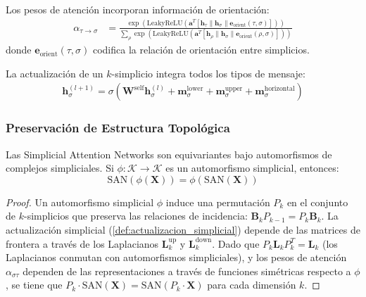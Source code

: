 \begin{definition}\label{def:pesos_atencion_simplicial}
Los pesos de atención incorporan información de orientación:
\begin{align}
    \alpha_{\tau \to \sigma} &= \frac{\exp(\text{LeakyReLU}(\mathbf{a}^T [\mathbf{h}_{\tau} \| \mathbf{h}_{\sigma} \| \mathbf{e}_{\text{orient}}(\tau,\sigma)]))}{\sum_{\rho} \exp(\text{LeakyReLU}(\mathbf{a}^T [\mathbf{h}_{\rho} \| \mathbf{h}_{\sigma} \| \mathbf{e}_{\text{orient}}(\rho,\sigma)]))}
\end{align}
donde $\mathbf{e}_{\text{orient}}(\tau,\sigma)$ codifica la relación de orientación entre simplicios.
\end{definition}

\begin{definition}\label{def:actualizacion_simplicial}
La actualización de un $k$-simplicio integra todos los tipos de mensaje:
\begin{align}
    \mathbf{h}_{\sigma}^{(l+1)} = \sigma\left(\mathbf{W}^{\text{self}} \mathbf{h}_{\sigma}^{(l)} + \mathbf{m}_{\sigma}^{\text{lower}} + \mathbf{m}_{\sigma}^{\text{upper}} + \mathbf{m}_{\sigma}^{\text{horizontal}}\right)
\end{align}
\end{definition}

\subsubsection{Preservación de Estructura Topológica}

\begin{theorem}\label{thm:equivarianza_simplicial}
Las Simplicial Attention Networks son equivariantes bajo automorfismos de complejos simpliciales. Si $\phi: \mathcal{K} \to \mathcal{K}$ es un automorfismo simplicial, entonces:
\begin{equation}
    \text{SAN}(\phi(\mathbf{X})) = \phi(\text{SAN}(\mathbf{X}))
\end{equation}
\end{theorem}

\begin{proof}
Un automorfismo simplicial $\phi$ induce una permutación $P_k$ en el conjunto de $k$-simplicios que preserva las relaciones de incidencia: $\mathbf{B}_k P_{k-1} = P_k \mathbf{B}_k$. La actualización simplicial (\autoref{def:actualizacion_simplicial}) depende de las matrices de frontera a través de los Laplacianos $\mathbf{L}_k^{\text{up}}$ y $\mathbf{L}_k^{\text{down}}$. Dado que $P_k \mathbf{L}_k P_k^T = \mathbf{L}_k$ (los Laplacianos conmutan con automorfismos simpliciales), y los pesos de atención $\alpha_{\sigma\tau}$ dependen de las representaciones a través de funciones simétricas respecto a $\phi$, se tiene que $P_k \cdot \text{SAN}(\mathbf{X}) = \text{SAN}(P_k \cdot \mathbf{X})$ para cada dimensión $k$.
\end{proof}


